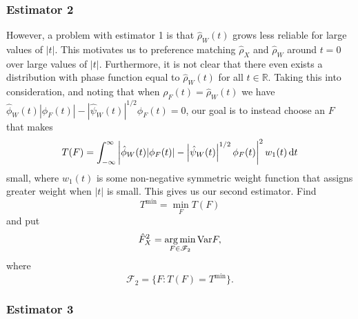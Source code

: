 	\subsubsection{Estimator 2}
	However, a problem with estimator 1 is that $\hat{\rho}_W(t)$ grows less reliable for large values of $|t|$. This motivates us to preference matching $\hat{\rho}_X$ and $\hat{\rho}_W$ around $t = 0$ over large values of $|t|$. Furthermore, it is not clear that there even exists a distribution with phase function equal to $\hat{\rho}_W(t)$ for all $t \in \mathbb{R}$. Taking this into consideration, and noting that when $\rho_F(t) = \hat{\rho}_W(t)$ we have $\hat{\phi}_W(t) |\phi_F(t)| - \left|\hat{\psi}_W(t)\right|^{1/2} \phi_F(t) = 0$, our goal is to instead choose an $F$ that makes
	\begin{equation}
		T(F) = \int_{-\infty}^\infty \left| \hat{\phi}_W(t) |\phi_F(t)| - \left|\hat{\psi}_W(t)\right|^{1/2} \phi_F(t) \right|^2 w_1(t) \, \mathrm{d} t
	\end{equation}
	small,
	where $w_1(t)$ is some non-negative symmetric weight function that assigns greater weight when $|t|$ is small. This gives us our second estimator.
	Find 
	\begin{equation}
		T^\mathrm{min} = \min_F T(F)
	\end{equation}
	and put
	\begin{equation}
		\hat{F}_X^2 = \operatorname*{arg\,min}_{F \in \mathscr{F}_2} \mathrm{Var}{F},
	\end{equation}
	where
	\begin{equation}
		\mathscr{F}_2 = \{F: T(F) = T^\mathrm{min}\}.
	\end{equation}

	\subsubsection{Estimator 3}

